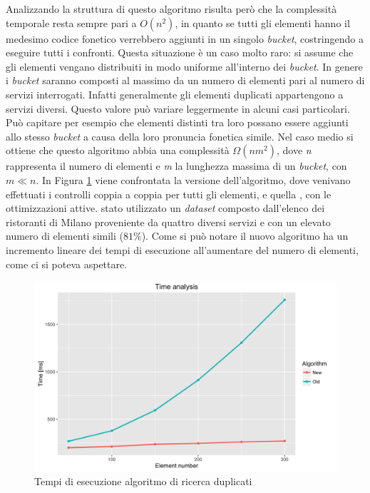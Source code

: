 Analizzando la struttura di questo algoritmo risulta però che la complessità temporale resta sempre pari a $ O(n^2) $, in quanto se tutti gli elementi hanno il medesimo codice fonetico verrebbero aggiunti in un singolo \emph{bucket}, costringendo a eseguire tutti i confronti. Questa situazione è un caso molto raro: si assume che gli elementi vengano distribuiti in modo uniforme all'interno dei \emph{bucket}. In genere i \emph{bucket} saranno composti al massimo da un numero di elementi pari al numero di servizi interrogati. Infatti generalmente gli elementi duplicati appartengono a servizi diversi. Questo valore può variare leggermente in alcuni casi particolari. Può capitare per esempio che elementi distinti tra loro possano essere aggiunti allo stesso \emph{bucket} a causa della loro pronuncia fonetica simile. Nel caso medio si ottiene che questo algoritmo abbia una complessità $ \Omega(nm^2) $, dove \emph{n} rappresenta il numero di elementi e \emph{m} la lunghezza massima di un \emph{bucket}, con $ m \ll n $. In Figura \ref{fig:tempo-esecuzione-algoritmo-duplicati} viene confrontata la versione  dell'algoritmo, dove venivano effettuati i controlli coppia a coppia per tutti gli elementi, e quella , con le ottimizzazioni attive. \upe stato utilizzato un \emph{dataset} composto dall'elenco dei ristoranti di Milano proveniente da quattro diversi servizi e con un elevato numero di elementi simili ($ 81\% $). Come si può notare il nuovo algoritmo ha un incremento lineare dei tempi di esecuzione all'aumentare del numero di elementi, come ci si poteva aspettare.

\begin{figure}[ht]
	\centering
	\includegraphics[width=\textwidth]{3-metodologia-camus/Immagini/similarity_time_analysis.png}
	\caption{Tempi di esecuzione algoritmo di ricerca duplicati}\label{fig:tempo-esecuzione-algoritmo-duplicati}
\end{figure}

